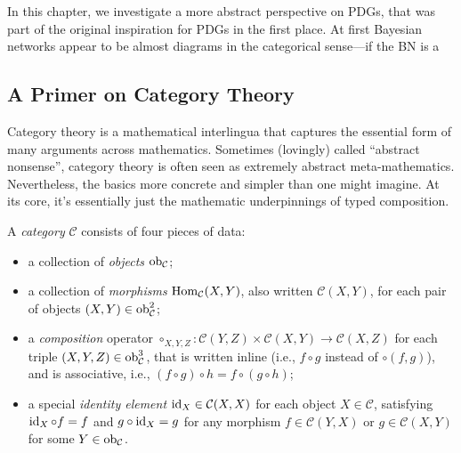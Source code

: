     \label{chap:PDG-cat}

In this chapter, we investigate a more abstract perspective on PDGs, that was part of the original inspiration for PDGs in the first place. 
At first Bayesian networks appear to be almost diagrams in the categorical sense---if the BN is a 

\subsection{A Primer on Category Theory}
Category theory is a mathematical interlingua that captures the essential form of many arguments across mathematics. 
Sometimes (lovingly) called ``abstract nonsense'', category theory is often seen as extremely abstract meta-mathematics.  
Nevertheless, the basics more concrete and simpler than one might imagine.
At its core, it's essentially just the mathematic underpinnings of typed composition.  

\begin{defn}[category]
    A \emph{category} $\mathcal C$ consists of four pieces of data:
    \begin{itemize}[left=0pt,topsep=0pt]
        \item a collection of \emph{objects} $\operatorname{\mathop{\mathrm{ob}}}_{\cal C}$;
        \item a collection of \emph{morphisms}
            $\operatorname{\mathop{\mathrm{Hom}}}_{\mathcal C}(X,Y)$,  also written $\mathcal C(X,Y)$, for each pair of objects $(X,Y) \in \operatorname{\mathop{\mathrm{ob}}}_{\mathcal C}^2$;
        \item a \emph{composition} operator 
        $\circ_{X,Y,Z}: \mathcal C(Y,Z) \times \mathcal C(X,Y) \to \mathcal C(X,Z)$ for each triple $(X,Y,Z) \in \operatorname{\mathop{\mathrm{ob}}}_{\cal C}^3$, that is written inline (i.e., $f \circ g$ instead of $\circ(f,g)$), and is associative, i.e., $(f \circ g) \circ h = f \circ (g \circ h)$;
        \item a special \emph{identity element} $\operatorname{\mathrm{id}}_{X} \in \mathcal C(X,X)$ for each object $X \in \mathcal C$, satisfying $\operatorname{\mathrm{id}}_X \circ f = f$ and $g \circ \operatorname{\mathrm{id}}_X = g$ for any morphism $f \in \mathcal C(Y,X)$ or $g \in \mathcal C(X,Y)$ for some $Y \in \operatorname{\mathop{\mathrm{ob}}}_{\mathcal C}$.
        \qedhere
    \end{itemize}    
\end{defn}


